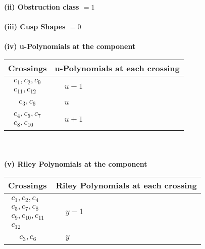 \documentclass[1p]{elsarticle_modified}
\theoremstyle{definition}
\begin{document}
\flushleft \textbf{(ii) Obstruction class $= 1$}\\~\\
\flushleft \textbf{(iii) Cusp Shapes $= 0$}\\~\\
\newpage\renewcommand{\arraystretch}{1}
\flushleft \textbf{(iv) u-Polynomials at the component}\newline \\
\begin{tabular}{m{50pt}|m{274pt}}
Crossings & \hspace{64pt}u-Polynomials at each crossing \\
\hline $$\begin{aligned}c_{1},c_{2},c_{9}\\c_{11},c_{12}\end{aligned}$$&$\begin{aligned}
&u-1
\end{aligned}$\\
\hline $$\begin{aligned}c_{3},c_{6}\end{aligned}$$&$\begin{aligned}
&u
\end{aligned}$\\
\hline $$\begin{aligned}c_{4},c_{5},c_{7}\\c_{8},c_{10}\end{aligned}$$&$\begin{aligned}
&u+1
\end{aligned}$\\
\hline
\end{tabular}\\~\\
\newpage\renewcommand{\arraystretch}{1}
\flushleft \textbf{(v) Riley Polynomials at the component}\newline \\
\begin{tabular}{m{50pt}|m{274pt}}
Crossings & \hspace{64pt}Riley Polynomials at each crossing \\
\hline $$\begin{aligned}c_{1},c_{2},c_{4}\\c_{5},c_{7},c_{8}\\c_{9},c_{10},c_{11}\\c_{12}\end{aligned}$$&$\begin{aligned}
&y-1
\end{aligned}$\\
\hline $$\begin{aligned}c_{3},c_{6}\end{aligned}$$&$\begin{aligned}
&y
\end{aligned}$\\
\hline
\end{tabular}\\~\\
\end{document}
